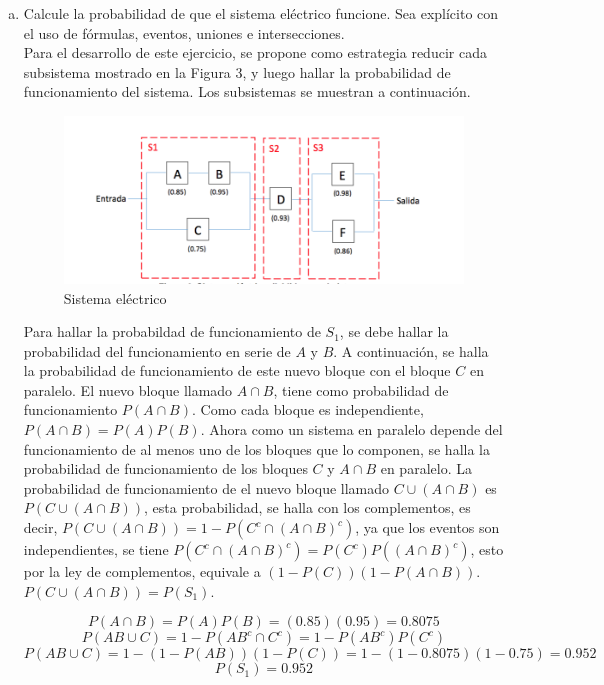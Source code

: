 \documentclass[11pt, spanish]{article}
\begin{document}
\begin{enumerate}[(a)]
\item Calcule la probabilidad de que el sistema eléctrico funcione. Sea explícito con el uso de fórmulas, eventos, uniones e intersecciones.\\

Para el desarrollo de este ejercicio, se propone como estrategia reducir cada subsistema mostrado en la Figura 3, y luego hallar la probabilidad de funcionamiento del sistema. Los subsistemas se muestran a continuación.

\begin{figure}[h]
\centering
	\includegraphics[scale=0.8]{subsystems.png}
	\caption{Sistema eléctrico}
\end{figure}

Para hallar la probabildad de funcionamiento de $S_{1}$, se debe hallar la probabilidad del funcionamiento en serie de $A$ y $B$. A continuación, se halla la probabilidad de funcionamiento de este nuevo bloque con el bloque $C$ en paralelo. El nuevo bloque llamado $A \cap B$, tiene como probabilidad de funcionamiento $P(A \cap B)$. Como cada bloque es independiente, $P(A \cap B) = P(A)P(B)$. Ahora como un sistema en paralelo depende del funcionamiento de al menos uno de los bloques que lo componen, se halla la probabilidad de funcionamiento de los bloques $C$ y $A \cap B$ en paralelo. La probabilidad de funcionamiento de el nuevo bloque llamado $C \cup (A \cap B)$ es $P(C \cup (A \cap B))$, esta probabilidad, se halla con los complementos, es decir, $P(C \cup (A \cap B)) = 1 - P(C^c \cap (A \cap B)^c)$, ya que los eventos son independientes, se tiene $P(C^c \cap (A \cap B)^c) = P(C^c)P((A \cap B)^c)$, esto por la ley de complementos, equivale a $(1 - P(C))(1 - P(A \cap B))$. $P(C \cup (A \cap B)) = P(S_{1})$.

$$P(A \cap B) = P(A)P(B) = (0.85)(0.95) = 0.8075$$
$$P(AB \cup C) = 1 - P(AB^c \cap C^c) = 1 - P(AB^c)P(C^c)$$
$$P(AB \cup C) = 1 - (1 - P(AB))(1 - P(C)) = 1 - (1-0.8075)(1-0.75) = 0.952$$
$$P(S_{1}) =  0.952$$


\end{enumerate}
\end{document}
